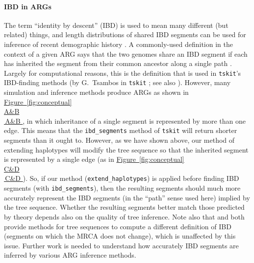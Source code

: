 \documentclass[10pt,twoside,lineno]{gsajnl}
\newcommand{\tskit}{\texttt{tskit}}
\newcommand*{\figref}[2][]{%
	\hyperref[{#2}]{%
		Figure~\ref*{#2}%
		\ifx\\#1\\%
		\else
		\,#1%
		\fi
	}%
}
\begin{document}
\paragraph{IBD in ARGs}
The term ``identity by descent'' (IBD) is used to mean many different (but related) things,
and length distributions of shared IBD segments can be used for inference of recent demographic history
\citep[for instance,][]{alasadi2018estimating,ringbauer2017inferring,browning2015accurate,yang2016rapidly,silcocks2023indigenous}.
A commonly-used definition in the context of a given ARG says that
the two genomes share an IBD segment if each has inherited the segment from their common ancestor
along a single path \citep[e.g.,][]{ralph2013geography}.
Largely for computational reasons, this is the definition that is used in \tskit's
IBD-finding methods 
(by G.~Tsambos in \tskit{} \citep{tskit}; see also \citet{tsambos2023link}).
However, many simulation and inference methods produce ARGs
as shown in \figref[A\&B]{fig:conceptual},
in which inheritance of a single segment is represented by more than one edge.
This means that the \texttt{ibd\_segments} method of \tskit{} will return shorter segments than it ought to.
However, as we have shown above,
our method of extending haplotypes will modify the tree sequence
so that the inherited segment is represented by a single edge
(as in \figref[C\&D]{fig:conceptual}).
So, if our method (\texttt{extend\_haplotypes}) is applied before finding IBD segments
(with  \texttt{ibd\_segments}),
then the resulting segments should much more accurately represent
the IBD segments (in the ``path'' sense used here) implied by the tree sequence.
Whether the resulting segments better match those predicted by theory depends
also on the quality of tree inference.
Note also that \citet{huang2024estimating} and \citet{guo2024strong}
both provide methods for tree sequences to compute a different definition of IBD
(segments on which the MRCA does not change),
which is unaffected by this issue.
Further work is needed to understand how accurately IBD segments
are inferred by various ARG inference methods.
\end{document}
